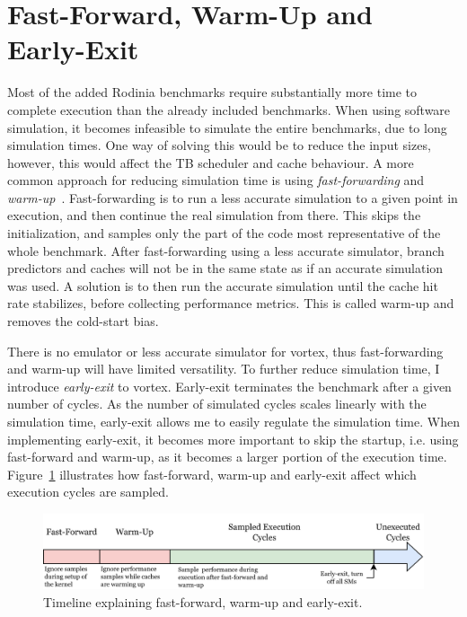 \section{Fast-Forward, Warm-Up and Early-Exit} \label{sec:ff_wu_ee}

Most of the added Rodinia benchmarks require substantially more time to complete execution than the already included benchmarks. When using software simulation, it becomes infeasible to simulate the entire benchmarks, due to long simulation times. One way of solving this would be to reduce the input sizes, however, this would affect the TB scheduler and cache behaviour. A more common approach for reducing simulation time is using \textit{fast-forwarding} and \textit{warm-up}~\cite{simpoint}. Fast-forwarding is to run a less accurate simulation to a given point in execution, and then continue the real simulation from there. This skips the initialization, and samples only the part of the code most representative of the whole benchmark. After fast-forwarding using a less accurate simulator, branch predictors and caches will not be in the same state as if an accurate simulation was used. A solution is to then run the accurate simulation until the cache hit rate stabilizes, before collecting performance metrics. This is called warm-up and removes the cold-start bias.

There is no emulator or less accurate simulator for \Gls{vortex}, thus fast-forwarding and warm-up will have limited versatility. To further reduce simulation time, I introduce \textit{early-exit} to \Gls{vortex}. Early-exit terminates the benchmark after a given number of cycles. As the number of simulated cycles scales linearly with the simulation time, early-exit allows me to easily regulate the simulation time. When implementing early-exit, it becomes more important to skip the startup, i.e. using fast-forward and warm-up, as it becomes a larger portion of the execution time. Figure~\ref{fig:ff-timeline} illustrates how fast-forward, warm-up and early-exit affect which execution cycles are sampled.

\begin{figure}
    \centering
    \includegraphics[width=\textwidth]{figures/fast-forward-timeline.png}
    \caption{Timeline explaining fast-forward, warm-up and early-exit.}
    \label{fig:ff-timeline}
\end{figure}

